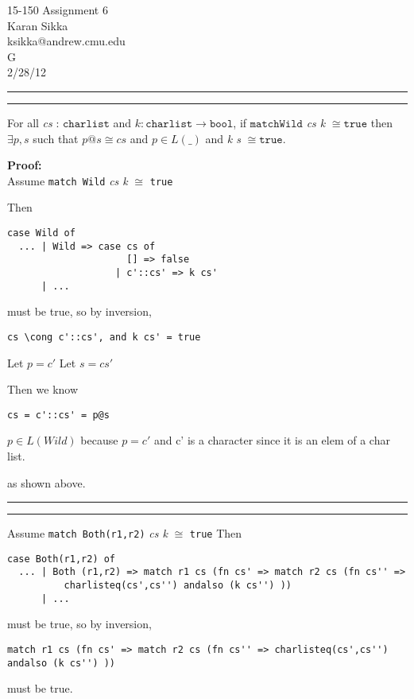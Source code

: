 \documentclass[11pt,letterpaper]{article}
\makeatletter
\newcommand{\question}[2] {\vspace{.25in} \hrule\vspace{0.5em}
\noindent{\bf #1: #2} \vspace{0.5em}
\hrule \vspace{.10in}}
\newcommand{\myname}{Karan Sikka}
\newcommand{\myandrew}{ksikka@andrew.cmu.edu}
\newcommand{\myhwnum}{6}
\makeatother
\begin{document}
\medskip

\thispagestyle{plain}
\begin{center}                  %
{\Large 15-150 Assignment \myhwnum} \\
\myname \\
\myandrew \\
G \\
2/28/12 \\
\end{center}


\question{1}{Task 2.2}
For all \emph{cs} :  $\mathtt{char list}$ and $k : \mathtt{char list} \rightarrow \mathtt{bool}$,
if $\mathtt{match Wild}$ \emph{cs k} $\cong \mathtt{true}$
then $\exists p, s$ such that $p@s \cong cs$ and $p \in L(\_)$ and \emph{k s} $\cong \mathtt{true}$.

\textbf{Proof:}\\
Assume \texttt{match Wild} \emph{cs k} $\cong$ \texttt{true}

Then
\begin{verbatim}
case Wild of 
  ... | Wild => case cs of 
                     [] => false 
                   | c'::cs' => k cs' 
      | ...
\end{verbatim}
must be true, so by inversion, 

\begin{verbatim}
cs \cong c'::cs', and k cs' = true
\end{verbatim}

Let $p = c'$
Let $s = cs'$

Then we know 
\begin{verbatim}
cs = c'::cs' = p@s
\end{verbatim}

$p \in L(Wild)$ because $p = c'$ and c' is a character since it is an elem of a char list.

 as shown above.


\question{2}{Task 2.4}
Assume \texttt{match Both(r1,r2)} \emph{cs k} $\cong$ \texttt{true}
Then
\begin{verbatim}
case Both(r1,r2) of
  ... | Both (r1,r2) => match r1 cs (fn cs' => match r2 cs (fn cs'' =>
          charlisteq(cs',cs'') andalso (k cs'') )) 
      | ...
\end{verbatim}
must be true, so by inversion,
\begin{verbatim}
match r1 cs (fn cs' => match r2 cs (fn cs'' => charlisteq(cs',cs'') andalso (k cs'') )) 
\end{verbatim}
must be true.
\end{document}
